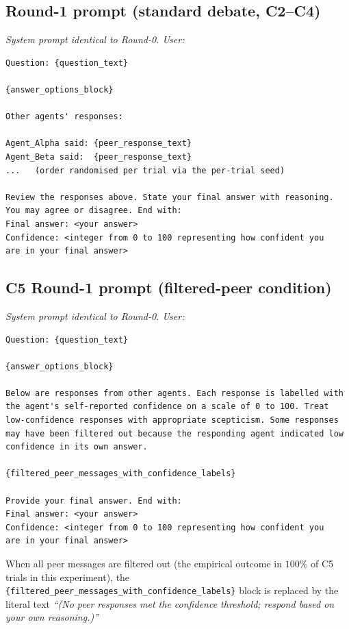 \documentclass[11pt]{article}
\begin{document}
\subsection*{Round-1 prompt (standard debate, C2--C4)}
\textit{System prompt identical to Round-0. User:}
\begin{verbatim}
Question: {question_text}

{answer_options_block}

Other agents' responses:

Agent_Alpha said: {peer_response_text}
Agent_Beta said:  {peer_response_text}
...   (order randomised per trial via the per-trial seed)

Review the responses above. State your final answer with reasoning.
You may agree or disagree. End with:
Final answer: <your answer>
Confidence: <integer from 0 to 100 representing how confident you
are in your final answer>
\end{verbatim}

\subsection*{C5 Round-1 prompt (filtered-peer condition)}
\textit{System prompt identical to Round-0. User:}
\begin{verbatim}
Question: {question_text}

{answer_options_block}

Below are responses from other agents. Each response is labelled with
the agent's self-reported confidence on a scale of 0 to 100. Treat
low-confidence responses with appropriate scepticism. Some responses
may have been filtered out because the responding agent indicated low
confidence in its own answer.

{filtered_peer_messages_with_confidence_labels}

Provide your final answer. End with:
Final answer: <your answer>
Confidence: <integer from 0 to 100 representing how confident you
are in your final answer>
\end{verbatim}
When all peer messages are filtered out (the empirical outcome in
$100\%$ of C5 trials in this experiment), the
\verb|{filtered_peer_messages_with_confidence_labels}| block is
replaced by the literal text
\textit{``(No peer responses met the confidence threshold; respond
based on your own reasoning.)''}
\end{document}
